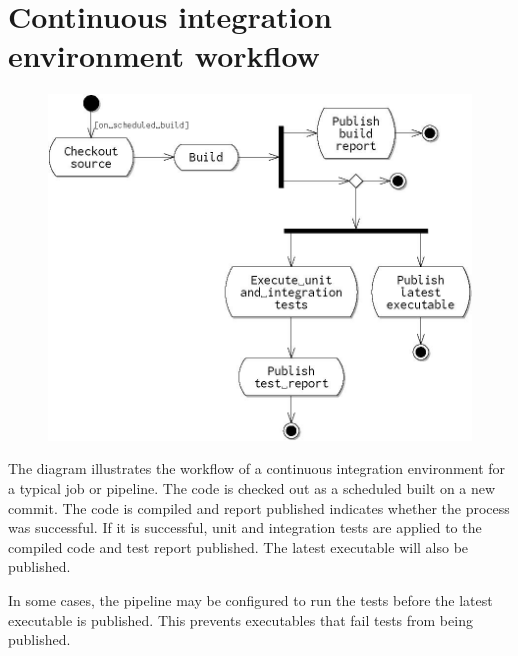 \documentclass[a4paper, openany]{memoir}
\begin{document}
\section{Continuous integration environment workflow}
\begin{figure}[H]
    \centering
    \includegraphics[scale=0.65]{src/9.5 continuous integration environment workflow.png}
\end{figure}
The diagram illustrates the workflow of a continuous integration environment for a typical job or pipeline. The code is checked out as a scheduled built on a new commit. The code is compiled and report published indicates whether the process was successful. If it is successful, unit and integration tests are applied to the compiled code and test report published. The latest executable will also be published.

In some cases, the pipeline may be configured to run the tests before the latest executable is published. This prevents executables that fail tests from being published.
\end{document}
